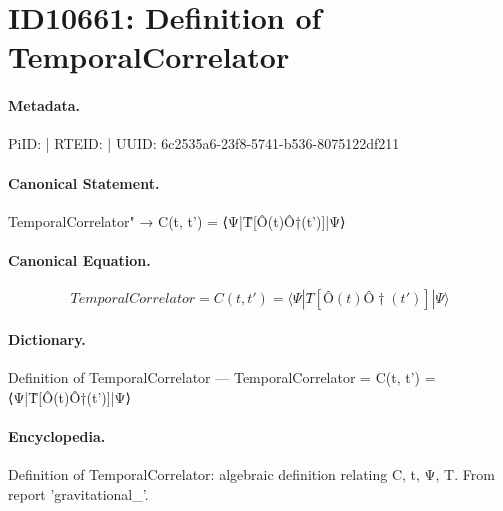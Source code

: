 \section*{ID10661: Definition of TemporalCorrelator}
\paragraph{Metadata.}
PiID:  | RTEID:  | UUID: 6c2535a6-23f8-5741-b536-8075122df211

\paragraph{Canonical Statement.}
TemporalCorrelator" → C(t, t') = ⟨Ψ|T̂[Ô(t)Ô†(t')]|Ψ⟩

\paragraph{Canonical Equation.}
\[
TemporalCorrelator = C(t, t') = ⟨Ψ|T̂[Ô(t)Ô†(t')]|Ψ⟩
\]

\paragraph{Dictionary.}
Definition of TemporalCorrelator — TemporalCorrelator = C(t, t') = ⟨Ψ|T̂[Ô(t)Ô†(t')]|Ψ⟩

\paragraph{Encyclopedia.}
Definition of TemporalCorrelator: algebraic definition relating C, t, Ψ, T. From report 'gravitational\_'.
